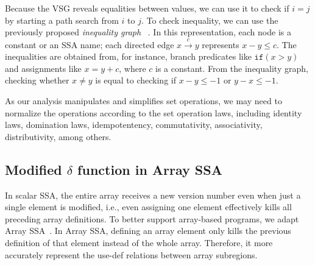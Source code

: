 
Because the VSG reveals equalities between values, we can use it to check if $i=j$ by starting a path search from $i$ to $j$. 
To check inequality, we can use the previously proposed \emph{inequality graph} ~\cite{ABCD}.
In this representation, each node is a constant or an SSA name;
each directed edge $x \xrightarrow{c} y$ represents $x-y\le c$. 
The inequalities are obtained from, for instance, branch predicates like $\texttt{if}(x>y)$ and assignments like $x = y + c$, where $c$ is a constant. 
From the inequality graph, checking whether $x \ne y$ is equal to checking if $x-y\le -1$ or $y-x\le -1$.

As our analysis manipulates and simplifies set operations, we may need to normalize the operations according to the set operation laws, including identity laws, domination laws, idempotentency, commutativity, associativity, distributivity, among others.



\subsection{Modified $\delta$ function in Array SSA}
\label{modified-ssa}


In scalar SSA, the entire array receives a new version number even when just a single element is modified, i.e., even assigning one element effectively kills all preceding array definitions.
To better support array-based programs, we adapt Array SSA~\cite{rus2006scalable}.
In Array SSA, defining an array element only kills the previous definition of that element instead of the whole array. 
Therefore, it more accurately represent the use-def relations between array subregions. 

